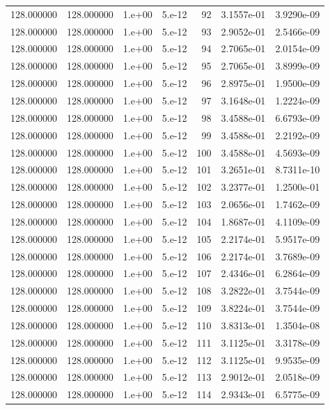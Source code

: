 \begin{table}[htbp]
\begin{tabular}{rrrrrrr}
128.000000 & 128.000000 & 1.e+00 & 5.e-12 & 92 & 3.1557e-01 & 3.9290e-09 \\
128.000000 & 128.000000 & 1.e+00 & 5.e-12 & 93 & 2.9052e-01 & 2.5466e-09 \\
128.000000 & 128.000000 & 1.e+00 & 5.e-12 & 94 & 2.7065e-01 & 2.0154e-09 \\
128.000000 & 128.000000 & 1.e+00 & 5.e-12 & 95 & 2.7065e-01 & 3.8999e-09 \\
128.000000 & 128.000000 & 1.e+00 & 5.e-12 & 96 & 2.8975e-01 & 1.9500e-09 \\
128.000000 & 128.000000 & 1.e+00 & 5.e-12 & 97 & 3.1648e-01 & 1.2224e-09 \\
128.000000 & 128.000000 & 1.e+00 & 5.e-12 & 98 & 3.4588e-01 & 6.6793e-09 \\
128.000000 & 128.000000 & 1.e+00 & 5.e-12 & 99 & 3.4588e-01 & 2.2192e-09 \\
128.000000 & 128.000000 & 1.e+00 & 5.e-12 & 100 & 3.4588e-01 & 4.5693e-09 \\
128.000000 & 128.000000 & 1.e+00 & 5.e-12 & 101 & 3.2651e-01 & 8.7311e-10 \\
128.000000 & 128.000000 & 1.e+00 & 5.e-12 & 102 & 3.2377e-01 & 1.2500e-01 \\
128.000000 & 128.000000 & 1.e+00 & 5.e-12 & 103 & 2.0656e-01 & 1.7462e-09 \\
128.000000 & 128.000000 & 1.e+00 & 5.e-12 & 104 & 1.8687e-01 & 4.1109e-09 \\
128.000000 & 128.000000 & 1.e+00 & 5.e-12 & 105 & 2.2174e-01 & 5.9517e-09 \\
128.000000 & 128.000000 & 1.e+00 & 5.e-12 & 106 & 2.2174e-01 & 3.7689e-09 \\
128.000000 & 128.000000 & 1.e+00 & 5.e-12 & 107 & 2.4346e-01 & 6.2864e-09 \\
128.000000 & 128.000000 & 1.e+00 & 5.e-12 & 108 & 3.2822e-01 & 3.7544e-09 \\
128.000000 & 128.000000 & 1.e+00 & 5.e-12 & 109 & 3.8224e-01 & 3.7544e-09 \\
128.000000 & 128.000000 & 1.e+00 & 5.e-12 & 110 & 3.8313e-01 & 1.3504e-08 \\
128.000000 & 128.000000 & 1.e+00 & 5.e-12 & 111 & 3.1125e-01 & 3.3178e-09 \\
128.000000 & 128.000000 & 1.e+00 & 5.e-12 & 112 & 3.1125e-01 & 9.9535e-09 \\
128.000000 & 128.000000 & 1.e+00 & 5.e-12 & 113 & 2.9012e-01 & 2.0518e-09 \\
128.000000 & 128.000000 & 1.e+00 & 5.e-12 & 114 & 2.9343e-01 & 6.5775e-09 \\

\end{tabular}
\end{table}
